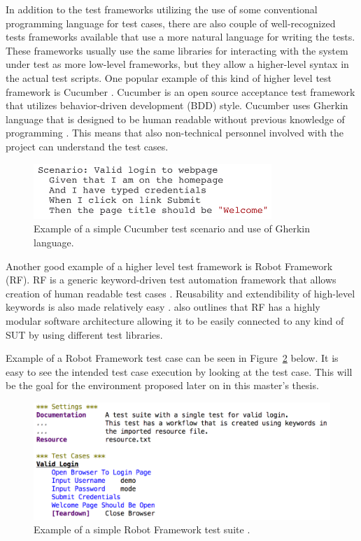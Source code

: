 In addition to the test frameworks utilizing the use of some conventional programming language for test cases, there are also couple of well-recognized tests frameworks available that use a more natural language for writing the tests. These frameworks usually use the same libraries for interacting with the system under test as more low-level frameworks, but they allow a higher-level syntax in the actual test scripts. One popular example of this kind of higher level test framework is Cucumber \citep{cucumber}. Cucumber is an open source acceptance test framework that utilizes behavior-driven development (BDD) style. Cucumber uses Gherkin language that is designed to be human readable without previous knowledge of programming \citep{gherkin}. This means that also non-technical personnel involved with the project can understand the test cases.

\begin{figure}[ht]
  \begin{center}
    \includegraphics[width=9cm]{images/cucumber_example.png}
    \caption{Example of a simple Cucumber test scenario and use of Gherkin language.}
    \label{fig:cucumber}
  \end{center}
\end{figure}
\FloatBarrier

Another good example of a higher level test framework is Robot Framework (RF). RF is a generic keyword-driven test automation framework that allows creation of human readable test cases \citep{robotframework}. Reusability and extendibility of high-level keywords is also made relatively easy \citep{stresnjak2011usage}. \cite{Rfuserguide} also outlines that RF has a highly modular software architecture allowing it to be easily connected to any kind of SUT by using different test libraries.

Example of a Robot Framework test case can be seen in Figure~\ref{fig:robot_example} below. It is easy to see the intended test case execution by looking at the test case. This will be the goal for the environment proposed later on in this master's thesis.

\begin{figure}[ht]
  \begin{center}
    \includegraphics[width=\textwidth]{images/robot_example.png}
    \caption{Example of a simple Robot Framework test suite \citep{robotframework}.}
    \label{fig:robot_example}
  \end{center}
\end{figure}
\FloatBarrier
